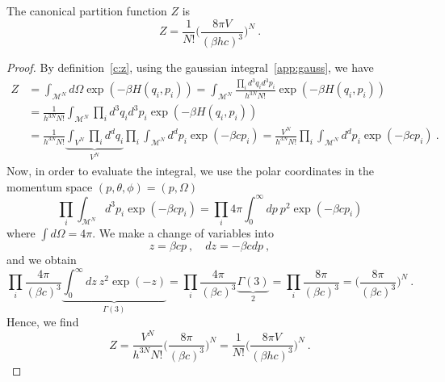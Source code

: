     The canonical partition function $Z$ is 
    \begin{equation*}
        Z = \frac{1}{N!} \Big (\frac{8\pi V}{(\beta h c)^3} \Big )^N ~.
    \end{equation*}
    \begin{proof}
        By definition~\eqref{c:z}, using the gaussian integral~\eqref{app:gauss}, we have
        \begin{equation*}
        \begin{aligned}
            Z & = \int_{\mathcal M^N} d\Omega \exp(- \beta H (q_i, p_i)) = \int_{\mathcal M^N} \frac{\prod_i d^3 q_i d^3 p_i}{h^{3N} N!} \exp(- \beta H (q_i, p_i)) \\ & = \frac{1}{h^{3N} N!} \int_{\mathcal M^N} \prod_i d^3 q_i d^3 p_i \exp(- \beta H (q_i, p_i)) \\ & = \frac{1}{h^{3N} N!} \underbrace{\int_{ V^N} \prod_i d^d q_i}_{V^N} \prod_i \int_{\mathcal M^N} d^d p_i \exp(- \beta c p_i)  = \frac{V^N}{h^{3N} N!} \prod_i \int_{\mathcal M^N} d^d p_i \exp(- \beta c p_i) ~.
        \end{aligned}
        \end{equation*}
        Now, in order to evaluate the integral, we use the polar coordinates in the momentum space $(p, \theta, \phi) = (p, \Omega)$ 
        \begin{equation*}
            \prod_i \int_{\mathcal M^N} d^3 p_i \exp(- \beta c p_i) = \prod_i 4 \pi \int_0^\infty dp ~ p^2 \exp(- \beta c p_i)
        \end{equation*}
        where $\int d\Omega = 4\pi$. We make a change of variables into
        \begin{equation*}
            z = \beta c p ~, \quad dz = - \beta c dp ~,
        \end{equation*}
        and we obtain 
        \begin{equation*}
            \prod_i \frac{4\pi}{(\beta c)^3} \underbrace{\int_0^\infty dz ~ z^2 \exp(- z)}_{\Gamma (3)} = \prod_i \frac{4\pi}{(\beta c)^3} \underbrace{\Gamma (3)}_2 = \prod_i \frac{8\pi}{(\beta c)^3} = \Big (\frac{8\pi}{(\beta c)^3} \Big )^N ~.
        \end{equation*}
        Hence, we find 
        \begin{equation*}
            Z = \frac{V^N}{h^{3N} N!} \Big (\frac{8\pi}{(\beta c)^3} \Big )^N = \frac{1}{N!} \Big (\frac{8\pi V}{(\beta h c)^3} \Big )^N ~.
        \end{equation*}
    \end{proof}

